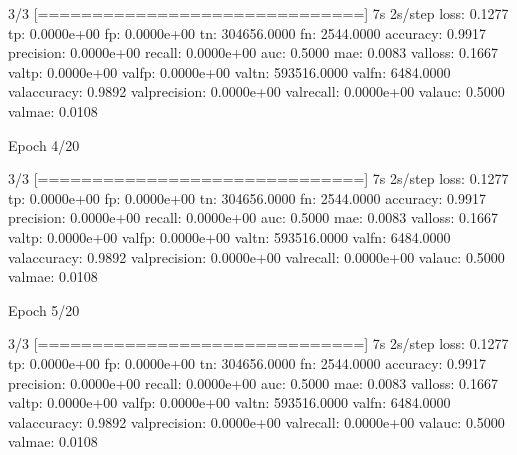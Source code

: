 \documentclass[letterpaper,10pt,english]{sphinxmanual}
\begin{document}
\begin{sphinxVerbatim}[commandchars=\\\{\}]
3/3 [==============================] \PYGZhy{} 7s 2s/step \PYGZhy{} loss: 0.1277 \PYGZhy{} tp: 0.0000e+00 \PYGZhy{} fp: 0.0000e+00 \PYGZhy{} tn: 304656.0000 \PYGZhy{} fn: 2544.0000 \PYGZhy{} accuracy: 0.9917 \PYGZhy{} precision: 0.0000e+00 \PYGZhy{} recall: 0.0000e+00 \PYGZhy{} auc: 0.5000 \PYGZhy{} mae: 0.0083 \PYGZhy{} val\PYGZus{}loss: 0.1667 \PYGZhy{} val\PYGZus{}tp: 0.0000e+00 \PYGZhy{} val\PYGZus{}fp: 0.0000e+00 \PYGZhy{} val\PYGZus{}tn: 593516.0000 \PYGZhy{} val\PYGZus{}fn: 6484.0000 \PYGZhy{} val\PYGZus{}accuracy: 0.9892 \PYGZhy{} val\PYGZus{}precision: 0.0000e+00 \PYGZhy{} val\PYGZus{}recall: 0.0000e+00 \PYGZhy{} val\PYGZus{}auc: 0.5000 \PYGZhy{} val\PYGZus{}mae: 0.0108
\end{sphinxVerbatim}

\begin{sphinxVerbatim}[commandchars=\\\{\}]
Epoch 4/20
\end{sphinxVerbatim}

\begin{sphinxVerbatim}[commandchars=\\\{\}]
3/3 [==============================] \PYGZhy{} 7s 2s/step \PYGZhy{} loss: 0.1277 \PYGZhy{} tp: 0.0000e+00 \PYGZhy{} fp: 0.0000e+00 \PYGZhy{} tn: 304656.0000 \PYGZhy{} fn: 2544.0000 \PYGZhy{} accuracy: 0.9917 \PYGZhy{} precision: 0.0000e+00 \PYGZhy{} recall: 0.0000e+00 \PYGZhy{} auc: 0.5000 \PYGZhy{} mae: 0.0083 \PYGZhy{} val\PYGZus{}loss: 0.1667 \PYGZhy{} val\PYGZus{}tp: 0.0000e+00 \PYGZhy{} val\PYGZus{}fp: 0.0000e+00 \PYGZhy{} val\PYGZus{}tn: 593516.0000 \PYGZhy{} val\PYGZus{}fn: 6484.0000 \PYGZhy{} val\PYGZus{}accuracy: 0.9892 \PYGZhy{} val\PYGZus{}precision: 0.0000e+00 \PYGZhy{} val\PYGZus{}recall: 0.0000e+00 \PYGZhy{} val\PYGZus{}auc: 0.5000 \PYGZhy{} val\PYGZus{}mae: 0.0108
\end{sphinxVerbatim}

\begin{sphinxVerbatim}[commandchars=\\\{\}]
Epoch 5/20
\end{sphinxVerbatim}

\begin{sphinxVerbatim}[commandchars=\\\{\}]
3/3 [==============================] \PYGZhy{} 7s 2s/step \PYGZhy{} loss: 0.1277 \PYGZhy{} tp: 0.0000e+00 \PYGZhy{} fp: 0.0000e+00 \PYGZhy{} tn: 304656.0000 \PYGZhy{} fn: 2544.0000 \PYGZhy{} accuracy: 0.9917 \PYGZhy{} precision: 0.0000e+00 \PYGZhy{} recall: 0.0000e+00 \PYGZhy{} auc: 0.5000 \PYGZhy{} mae: 0.0083 \PYGZhy{} val\PYGZus{}loss: 0.1667 \PYGZhy{} val\PYGZus{}tp: 0.0000e+00 \PYGZhy{} val\PYGZus{}fp: 0.0000e+00 \PYGZhy{} val\PYGZus{}tn: 593516.0000 \PYGZhy{} val\PYGZus{}fn: 6484.0000 \PYGZhy{} val\PYGZus{}accuracy: 0.9892 \PYGZhy{} val\PYGZus{}precision: 0.0000e+00 \PYGZhy{} val\PYGZus{}recall: 0.0000e+00 \PYGZhy{} val\PYGZus{}auc: 0.5000 \PYGZhy{} val\PYGZus{}mae: 0.0108
\end{sphinxVerbatim}
\end{document}
